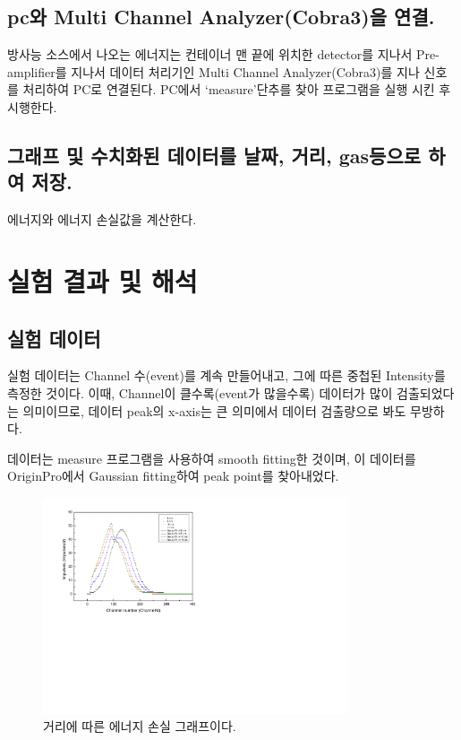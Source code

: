 \documentclass[a4paper, 10pt, nanum]{CSUniSchoolLabReport}
\begin{document}
\subsection{pc와 Multi Channel Analyzer(Cobra3)을 연결.}

	방사능 소스에서 나오는 에너지는 컨테이너 맨 끝에 위치한 detector를 지나서 Pre-amplifier를 지나서 데이터 처리기인 Multi Channel Analyzer(Cobra3)를 지나 신호를 처리하여 PC로 연결된다. PC에서 ‘measure’단추를 찾아 프로그램을 실행 시킨 후 시행한다. 

\subsection{그래프 및 수치화된 데이터를 날짜, 거리, gas등으로 하여 저장.}

	에너지와 에너지 손실값을 계산한다.


\section{실험 결과 및 해석}


\subsection{실험 데이터}

	실험 데이터는 Channel 수(event)를 계속 만들어내고, 그에 따른 중첩된 Intensity를 측정한 것이다. 이때, Channel이 클수록(event가 많을수록) 데이터가 많이 검출되었다는 의미이므로, 데이터 peak의 x-axis는 큰 의미에서 데이터 검출량으로 봐도 무방하다.

	데이터는 measure 프로그램을 사용하여 smooth fitting한 것이며, 이 데이터를 OriginPro에서 Gaussian fitting하여 peak point를 찾아내었다.

	\begin{figure}[htb!]
		\centering
		\includegraphics[viewport=1mm 99mm 180mm 200mm, width=9cm, clip=true]{fig2.pdf}
		\caption{거리에 따른 에너지 손실 그래프이다.}
		\label{fig:2}
	\end{figure}
\end{document}
